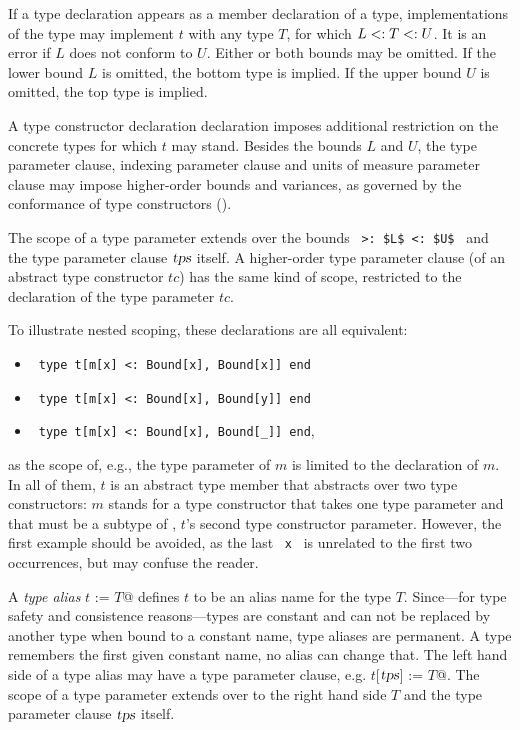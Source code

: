 If a type declaration appears as a member declaration of a type, implementations of the type may implement $t$ with any type $T$, for which $L <: T <: U$. It is an error if $L$ does not conform to $U$. Either or both bounds may be omitted. If the lower bound $L$ is omitted, the bottom type  is implied. If the upper bound $U$ is omitted, the top type  is implied. 

A type constructor declaration declaration imposes additional restriction on the concrete types for which $t$ may stand. Besides the bounds $L$ and $U$, the type parameter clause, indexing parameter clause and units of measure parameter clause may impose higher-order bounds and variances, as governed by the conformance of type constructors ().

The scope of a type parameter extends over the bounds ~\lstinline!>: $L$ <: $U$!~ and the type parameter clause $\mbox{\sl tps}$ itself. A higher-order type parameter clause (of an abstract type constructor $tc$) has the same kind of scope, restricted to the declaration of the type parameter $tc$. 

To illustrate nested scoping, these declarations are all equivalent: 
\begin{itemize}
  \item[] ~\lstinline!type t[m[x] <: Bound[x], Bound[x]] end! 

  \item[] ~\lstinline!type t[m[x] <: Bound[x], Bound[y]] end!

  \item[] ~\lstinline!type t[m[x] <: Bound[x], Bound[_]] end!,
\end{itemize} 
as the scope of, e.g., the type parameter of $m$ is limited to the declaration of $m$. In all of them, $t$ is an abstract type member that abstracts over two type constructors: $m$ stands for a type constructor that takes one type parameter and that must be a subtype of , $t$'s second type constructor parameter. However, the first example should be avoided, as the last ~\lstinline!x!~ is unrelated to the first two occurrences, but may confuse the reader. 

A {\em type alias} \lstinline@type $t$ := $T$@ defines $t$ to be an alias name for the type $T$. Since---for type safety and consistence reasons---types are constant and can not be replaced by another type when bound to a constant name, type aliases are permanent. A type remembers the first given constant name, no alias can change that. The left hand side of a type alias may have a type parameter clause, e.g. \lstinline@type $t$[$\mbox{\sl tps}$] := $T$@. The scope of a type parameter extends over to the right hand side $T$ and the type parameter clause $\mbox{\sl tps}$ itself. 

